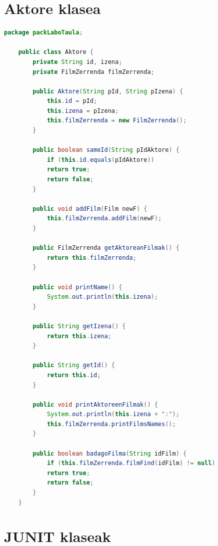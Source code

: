 \documentclass[a4paper,10pt]{report}
\begin{document}
\section{Aktore klasea}
\begin{lstlisting}[language=java]
	package packLaboTaula;
	
	public class Aktore {
		private String id, izena;
		private FilmZerrenda filmZerrenda;
		
		public Aktore(String pId, String pIzena) {
			this.id = pId;
			this.izena = pIzena;
			this.filmZerrenda = new FilmZerrenda();
		}
		
		public boolean sameId(String pIdAktore) {
			if (this.id.equals(pIdAktore))
			return true;
			return false;
		}
		
		public void addFilm(Film newF) {
			this.filmZerrenda.addFilm(newF);
		}
		
		public FilmZerrenda getAktoreanFilmak() {
			return this.filmZerrenda;
		}
		
		public void printName() {
			System.out.println(this.izena);
		}
		
		public String getIzena() {
			return this.izena;
		}
		
		public String getId() {
			return this.id;
		}
		
		public void printAktoreenFilmak() {
			System.out.println(this.izena + ":");
			this.filmZerrenda.printFilmsNames();
		}
		
		public boolean badagoFilma(String idFilm) {
			if (this.filmZerrenda.filmFind(idFilm) != null)
			return true;
			return false;
		}
	}
\end{lstlisting}

\section{JUNIT klaseak}
\end{document}

